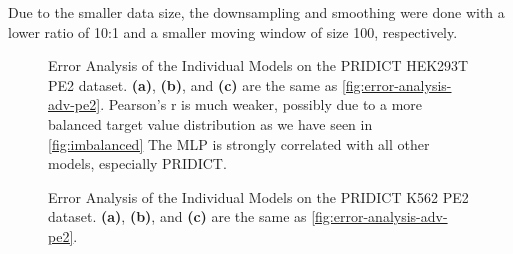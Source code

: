 Due to the smaller data size, the downsampling and smoothing were done with a lower ratio of 10:1 and a smaller moving window of size 100, respectively. 

\begin{figure}
    \centering
    \caption[Error Analysis of the Individual Models on PRIDICT HEK293T PE2 dataset]{Error Analysis of the Individual Models on the PRIDICT HEK293T PE2 dataset. \textbf{(a)}, \textbf{(b)}, and \textbf{(c)} are the same as \autoref{fig:error-analysis-adv-pe2}. Pearson's r is much weaker, possibly due to a more balanced target value distribution as we have seen in \autoref{fig:imbalanced} The MLP is strongly correlated with all other models, especially PRIDICT.}
    \label{fig:error-analysis-hek293t-pe2}
\end{figure}

\begin{figure}
    \centering
    \caption[Error Analysis of the Individual Models on PRIDICT K562 PE2 dataset]{Error Analysis of the Individual Models on the PRIDICT K562 PE2 dataset. \textbf{(a)}, \textbf{(b)}, and \textbf{(c)} are the same as \autoref{fig:error-analysis-adv-pe2}.}
    \label{fig:error-analysis-k562-pe2}
\end{figure}

